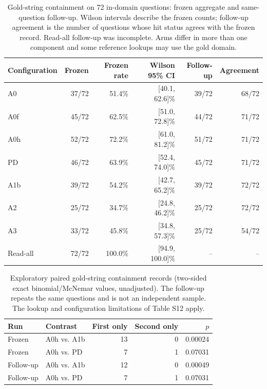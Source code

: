 \begin{table}[t]
\centering\small
\caption{Gold-string containment on 72 in-domain questions: frozen aggregate and same-question follow-up. Wilson intervals describe the frozen counts; follow-up agreement is the number of questions whose hit status agrees with the frozen record. Read-all follow-up was incomplete. Arms differ in more than one component and some reference lookups may use the gold domain.}
\label{tab:s-arm-data}
\begin{tabular}{lrrrrr}
\toprule
Configuration & Frozen & Frozen rate & Wilson 95\% CI & Follow-up & Agreement \\
\midrule
A0 & 37/72 & 51.4\% & [40.1, 62.6]\% & 39/72 & 68/72 \\
A0f & 45/72 & 62.5\% & [51.0, 72.8]\% & 44/72 & 71/72 \\
A0h & 52/72 & 72.2\% & [61.0, 81.2]\% & 51/72 & 71/72 \\
PD & 46/72 & 63.9\% & [52.4, 74.0]\% & 45/72 & 71/72 \\
A1b & 39/72 & 54.2\% & [42.7, 65.2]\% & 39/72 & 72/72 \\
A2 & 25/72 & 34.7\% & [24.8, 46.2]\% & 25/72 & 72/72 \\
A3 & 33/72 & 45.8\% & [34.8, 57.3]\% & 25/72 & 54/72 \\
Read-all & 72/72 & 100.0\% & [94.9, 100.0]\% & -- & -- \\
\bottomrule
\end{tabular}
\end{table}
\begin{table}[t]
\centering\small
\caption{Exploratory paired gold-string containment records (two-sided exact binomial/McNemar values, unadjusted). The follow-up repeats the same questions and is not an independent sample. The lookup and configuration limitations of Table S12 apply.}
\label{tab:s-paired-data}
\begin{tabular}{llrrr}
\toprule
Run & Contrast & First only & Second only & $p$ \\
\midrule
Frozen & A0h vs. A1b & 13 & 0 & 0.00024 \\
Frozen & A0h vs. PD & 7 & 1 & 0.07031 \\
Follow-up & A0h vs. A1b & 12 & 0 & 0.00049 \\
Follow-up & A0h vs. PD & 7 & 1 & 0.07031 \\
\bottomrule
\end{tabular}
\end{table}
